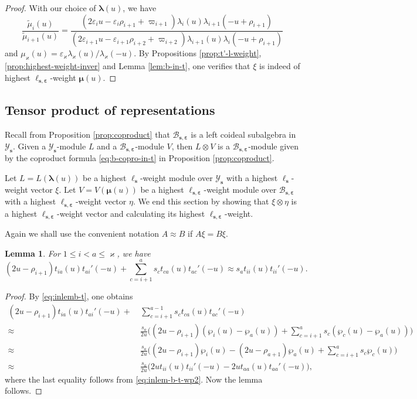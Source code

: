 \documentclass[11pt,reqno]{amsart}
\numberwithin{equation}{section}
\newtheorem{lem}[thm]{Lemma}
\theoremstyle{definition}
\theoremstyle{remark}
\newcommand{\tl}{\tilde}
\newcommand{\lle}{\leqslant}
\newcommand{\la}{\lambda}
\newcommand{\bla}{\bm\lambda}
\newcommand{\YMN}{{\mathscr{Y}_{\bm s}}}
\newcommand{\BMN}{{\mathscr{B}_{\bm s,\bm \ve}}}
\newcommand{\ka}{\varkappa}
\newcommand{\ve}{\varepsilon}
\newcommand{\s}{{\bm s}}
\begin{document}
\begin{proof}
With our choice of $\bla(u)$, we  have
\[
\frac{\tl \mu_i(u)}{\tl \mu_{i+1}(u)}=\frac{(2\ve_{i}u-\ve_{i}\rho_{i+1}+\varpi_{i+1})\la_i(u) \la_{i+1}(-u+\rho_{i+1})}{(2\ve_{i+1}u-\ve_{i+1}\rho_{i+2}+\varpi_{i+2})\la_{i+1}(u)\la_i(-u+\rho_{i+1})}
\]
and $\mu_\ka(u)=\ve_\ka\la_\ka(u)/\la_\ka(-u)$. By Propositions \ref{prop:t'-l-weight}, \ref{prop:highest-weight-inver} and Lemma \ref{lem:b-in-t}, one verifies that $\xi$ is  indeed of highest $\ell_{\s,\bm\ve}$-weight $\bm\mu(u)$.
\end{proof}
\subsection{Tensor product of representations}
Recall from Proposition \ref{prop:coproduct} that $\BMN$ is a left coideal subalgebra in $\YMN$. Given a $\YMN$-module $L$ and a $\BMN$-module $V$, then $L\otimes V$ is a $\BMN$-module given by the coproduct formula \eqref{eq:b-copro-in-t} in Proposition \ref{prop:coproduct}.

Let $L=L(\bla(u))$ be a highest $\ell_\s$-weight module over $\YMN$ with a highest $\ell_\s$-weight vector $\xi$. Let $V=V(\bm\mu(u))$ be a highest $\ell_{\s,\bm\ve}$-weight module over $\BMN$ with a highest $\ell_{\s,\bm\ve}$-weight vector $\eta$. We end this section by showing that $\xi\otimes \eta$ is a highest $\ell_{\s,\bm\ve}$-weight vector and calculating its highest $\ell_{\s,\bm\ve}$-weight.

Again we shall use the convenient notation $A\approx B$ if $A\xi =B\xi$.

\begin{lem}\label{lem:sum-T-}
For $1\lle i < a\lle \ka$, we have
\[
(2u-\rho_{i+1})t_{ia}(u)t_{ai}'(-u)+\sum_{c=i+1}^a s_ct_{ca}(u)t_{ac}'(-u)\approx s_at_{ii}(u)t_{ii}'(-u).
\]
\end{lem}
\begin{proof}
By \eqref{eq:inlemb-t}, one obtains
\begin{align*}
    (2u-\rho_{i+1})t_{ia}(u)t_{ai}'(-u)+& \ \sum_{c=i+1}^{a-1} s_ct_{ca}(u)t_{ac}'(-u)\\
\approx &\  \frac{s_a}{2u}\Big((2u-\rho_{i+1})(\wp_i(u)-\wp_a(u))+\sum_{c=i+1}^a s_c(\wp_c(u)-\wp_a(u))\Big)\\
\approx &\  \frac{s_a}{2u}\Big((2u-\rho_{i+1})\wp_i(u)-(2u-\rho_{a+1})\wp_a(u)+\sum_{c=i+1}^a s_c\wp_c(u)\Big)\\
\approx &\ \frac{s_a}{2u}\Big(2ut_{ii}(u)t_{ii}'(-u)-2ut_{aa}(u)t_{aa}'(-u)\Big),
\end{align*}
where the last equality follows from \eqref{eq:inlem-b-t-wp2}. Now the lemma follows.
\end{proof}
\end{document}
